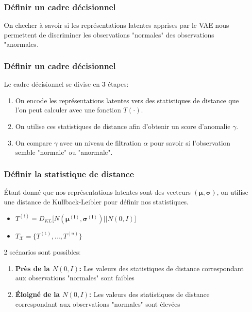 \documentclass{beamer}
\begin{document}
	\begin{frame}
		\frametitle{Définir un cadre décisionnel}
		On checher à savoir si les représentations latentes apprises par le VAE nous permettent de discriminer les observations "normales" des observations "anormales.
	\end{frame}

	\begin{frame}
		\frametitle{Définir un cadre décisionnel}
		Le cadre décisionnel se divise en 3 étapes:
		\begin{enumerate}
			\item On encode les représentations latentes vers des statistiques de distance que l'on peut calculer avec une fonction $T(\cdot)$.
			\item On utilise ces statistiques de distance afin d'obtenir un score d'anomalie $\gamma$.
			\item On compare $\gamma$ avec un niveau de filtration $\alpha$ pour savoir si l'observation semble "normale" ou "anormale".
		\end{enumerate}
	\end{frame}

	\begin{frame}
		\frametitle{Définir la statistique de distance}
		Étant donné que nos représentations latentes sont des vecteurs $(\boldsymbol{\mu}, \boldsymbol{\sigma})$, on utilise une distance de Kullback-Leibler pour définir nos statistiques.
		\begin{itemize}
			\item  $T^{(i)} = D_{KL}\big[N(\boldsymbol{\mu^{(i)}}, \boldsymbol{\sigma^{(i)}}) || N(0, I)\big]$
			\item $T_{\mathcal{X}}=\{T^{(1)}, ..., T^{(n)}\}$
		\end{itemize}
		\vfill
		2 scénarios sont possibles:
		\begin{enumerate}
			\item \textbf{Près de la $N(0,I)$:} Les valeurs des statistiques de distance correspondant aux observations "normales" sont faibles
			\item \textbf{Éloigné de la $N(0,I)$:} Les valeurs des statistiques de distance correspondant aux observations "normales" sont élevées
		\end{enumerate}
		
	\end{frame}
\end{document}
